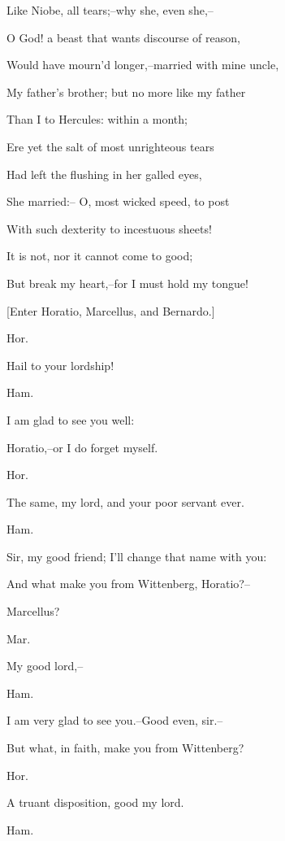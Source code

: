 \documentclass[12pt]{book}
\begin{document}
Like Niobe, all tears;--why she, even she,--

O God! a beast that wants discourse of reason,

Would have mourn'd longer,--married with mine uncle,

My father's brother; but no more like my father

Than I to Hercules: within a month;

Ere yet the salt of most unrighteous tears

Had left the flushing in her galled eyes,

She married:-- O, most wicked speed, to post

With such dexterity to incestuous sheets!

It is not, nor it cannot come to good;

But break my heart,--for I must hold my tongue!



[Enter Horatio, Marcellus, and Bernardo.]



Hor.

Hail to your lordship!



Ham.

I am glad to see you well:

Horatio,--or I do forget myself.



Hor.

The same, my lord, and your poor servant ever.



Ham.

Sir, my good friend; I'll change that name with you:

And what make you from Wittenberg, Horatio?--

Marcellus?



Mar.

My good lord,--



Ham.

I am very glad to see you.--Good even, sir.--

But what, in faith, make you from Wittenberg?



Hor.

A truant disposition, good my lord.



Ham.
\end{document}
